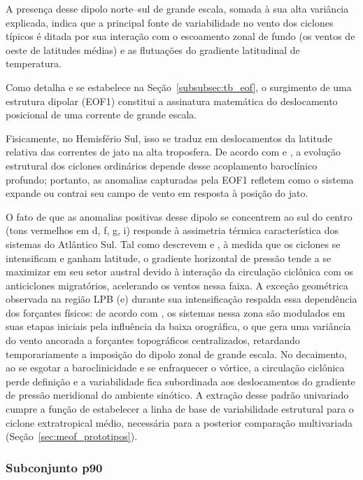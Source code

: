 A presença desse dipolo norte--sul de grande escala, somada à sua alta variância explicada, indica que a principal fonte de variabilidade no vento dos ciclones típicos é ditada por sua interação com o escoamento zonal de fundo (os ventos de oeste de latitudes médias) e as flutuações do gradiente latitudinal de temperatura.

Como detalha \citet{hannachi2007empirical} e se estabelece na Seção~\ref{subsubsec:tb_eof}, o surgimento de uma estrutura dipolar (EOF1) constitui a assinatura matemática do deslocamento posicional de uma corrente de grande escala.

Fisicamente, no Hemisfério Sul, isso se traduz em deslocamentos da latitude relativa das correntes de jato na alta troposfera.
De acordo com \citet{hoskins2005new} e \citet{dossantos2023response}, a evolução estrutural dos ciclones ordinários depende desse acoplamento baroclínico profundo; portanto, as anomalias capturadas pela EOF1 refletem como o sistema expande ou contrai seu campo de vento em resposta à posição do jato.

O fato de que as anomalias positivas desse dipolo se concentrem ao sul do centro (tons vermelhos em d, f, g, i) responde à assimetria térmica característica dos sistemas do Atlântico Sul.
Tal como descrevem \citet{sinclair1997objective} e \citet{reboita2010south}, à medida que os ciclones se intensificam e ganham latitude, o gradiente horizontal de pressão tende a se maximizar em seu setor austral devido à interação da circulação ciclônica com os anticiclones migratórios, acelerando os ventos nessa faixa.
A exceção geométrica observada na região LPB (e) durante sua intensificação respalda essa dependência dos forçantes físicos: de acordo com \citet{gramcianinov2019properties}, os sistemas nessa zona são modulados em suas etapas iniciais pela influência da baixa orográfica, o que gera uma variância do vento ancorada a forçantes topográficos centralizados, retardando temporariamente a imposição do dipolo zonal de grande escala.
No decaimento, ao se esgotar a baroclinicidade e se enfraquecer o vórtice, a circulação ciclônica perde definição e a variabilidade fica subordinada aos deslocamentos do gradiente de pressão meridional do ambiente sinótico.
A extração desse padrão univariado cumpre a função de estabelecer a linha de base de variabilidade estrutural para o ciclone extratropical médio, necessária para a posterior comparação multivariada (Seção~\ref{sec:meof_prototipos}).

\subsubsection{Subconjunto p90}\label{subsubsec:eof1_wind10_p90}

